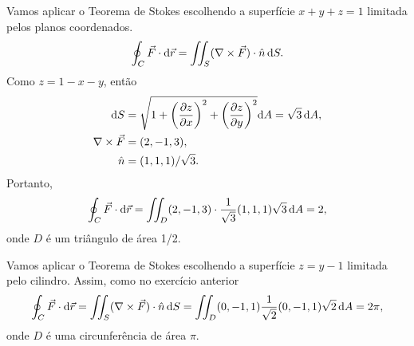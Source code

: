 \begin{questions}
\begin{solution}
    Vamos aplicar o Teorema de Stokes escolhendo a superfície $x+y+z=1$ limitada pelos planos coordenados.
    \[
        \oint_C \vec F \cdot \mathrm{d} \vec r
            = \iint_S (\nabla \times \vec F) \cdot \hat n\,\mathrm{d} S.
    \]
    Como $z = 1-x-y$, então
    \begin{align*}
        \mathrm{d} S &= \sqrt{1+\left(\frac{\partial z}{\partial x}\right)^2+\left(\frac{\partial z}{\partial y}\right)^2}\mathrm{d} A = \sqrt{3}\,\mathrm{d} A, \\
        \nabla \times \vec F &= (2,-1,3), \\
        \hat n &= (1,1,1)/\sqrt{3}.
    \end{align*}
    Portanto,
    \[\oint_C \vec F \cdot \mathrm{d} \vec r = \iint_D (2,-1,3) \cdot \frac{1}{\sqrt{3}}(1,1,1) \sqrt{3}\,\mathrm{d} A = 2,\]
    onde $D$ é um triângulo de área 1/2.
\end{solution}


\begin{solution}
    Vamos aplicar o Teorema de Stokes escolhendo a superfície $z = y-1$ limitada pelo cilindro. Assim, como no exercício anterior
    \[
        \oint_C \vec F \cdot \mathrm{d} \vec r
            = \iint_S (\nabla \times \vec F) \cdot \hat n\,\mathrm{d} S
            = \iint_D (0,-1,1) \frac{1}{\sqrt{2}} (0,-1,1) \sqrt{2} \,\mathrm{d} A
            = 2 \pi,
    \]
    onde $D$ é uma circunferência de área $\pi$.
\end{solution}

\setcounter{question}{8}


\end{questions}
